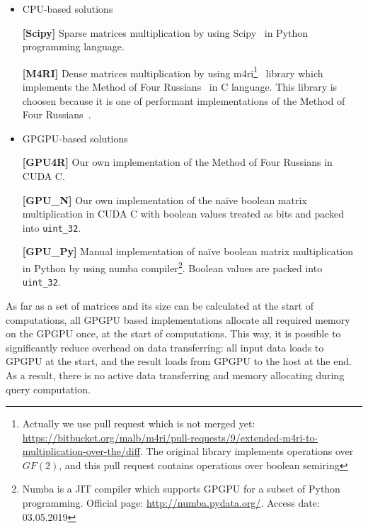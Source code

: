 \begin{itemize}
  \item CPU-based solutions

    \textbf{[Scipy]} Sparse matrices multiplication by using Scipy~\cite{scipy} in Python programming language.

    \textbf{[M4RI]} Dense matrices multiplication by using m4ri\footnote{Actually we use pull request which is not merged yet: \url{https://bitbucket.org/malb/m4ri/pull-requests/9/extended-m4ri-to-multiplication-over-the/diff}. The original library implements operations over $GF(2)$, and this pull request contains operations over boolean semiring}~\cite{M4RI} library which implements the Method of Four Russians~\cite{arlazarov1970economical} in C language.
    This library is choosen because it is one of performant implementations of the Method of Four Russians~\cite{albrechtefficient}.
  \item GPGPU-based solutions

    \textbf{[GPU4R]} Our own implementation of the Method of Four Russians in CUDA C.

    \textbf{[GPU\_N]} Our own implementation of the na\"ive boolean matrix multiplication in CUDA C with boolean values treated as bits and packed into \texttt{uint\_32}.

    \textbf{[GPU\_Py]} Manual implementation of na\"ive boolean matrix multiplication in Python by using numba compiler\footnote{Numba is a JIT compiler which supports GPGPU for a subset of Python programming. Official page: \url{http://numba.pydata.org/}. Access date: 03.05.2019}.
    Boolean values are packed into \texttt{uint\_32}.

\end{itemize}

As far as a set of matrices and its size can be calculated at the start of computations, all GPGPU based implementations allocate all required memory on the GPGPU once, at the start of computations.
This way, it is possible to significantly reduce overhead on data transferring: all input data loads to GPGPU at the start, and the result loads from GPGPU to the host at the end.
As a result, there is no active data transferring and memory allocating during query computation.
